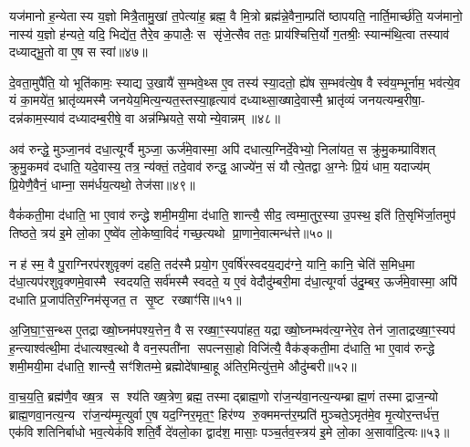 यज॑मानो ह॒न्येतास्य य॒ज्ञो मित्रै॒तामु॒खां त॒पेत्या॑ह॒ ब्रह्म॒ वै मि॒त्रो ब्रह्म॑न्ने॒वैना॒म्प्रति॑ ष्ठापयति॒ नार्ति॒मार्च्छ॑ति॒ यज॑मानो॒ नास्य॑ य॒ज्ञो ह॑न्यते॒ यदि॒ भिद्ये॑त॒ तैरे॒व क॒पालैः॒ स सृ॑जे॒त्सैव ततः॒ प्राय॑श्चित्ति॒र्यो ग॒तश्रीः॒ स्यान्म॑थि॒त्वा तस्याव॑ दध्याद्भू॒तो वा ए॒ष स स्वां॥४७॥

दे॒वता॒मुपै॑ति॒ यो भूति॑कामः॒ स्याद्य उ॒खायै॑ स॒म्भवे॒थ्स ए॒व तस्य॑ स्या॒दतो॒ ह्ये॑ष स॒म्भव॑त्ये॒ष वै स्व॑य॒म्भूर्नाम॒ भव॑त्ये॒व यं का॒मये॑त॒ भ्रातृ॑व्यमस्मै जनयेय॒मित्य॒न्यत॒स्तस्या॒हृत्याव॑ दध्याथ्सा॒ख्षादे॒वास्मै॒ भ्रातृ॑व्यं जनयत्यम्ब॒रीषा॒- दन्न॑काम॒स्याव॑ दध्यादम्ब॒रीषे॒ वा अन्न॑म्भ्रियते॒ सयोन्ये॒वान्नम्॥४८॥

अव॑ रुन्द्धे॒ मुञ्जा॒नव॑ दधा॒त्यूर्ग्वै मुञ्जा॒ ऊर्ज॑मे॒वास्मा॒ अपि॑ दधात्य॒ग्निर्दे॒वेभ्यो॒ निला॑यत॒ स क्रु॑मु॒कम्प्रावि॑शत् क्रुमु॒कमव॑ दधाति॒ यदे॒वास्य॒ तत्र॒ न्य॑क्तं॒ तदे॒वाव॑ रुन्द्ध॒ आज्ये॑न॒ सं यौत्ये॒तद्वा अ॒ग्नेः प्रि॒यं धाम॒ यदाज्य॑म् प्रि॒येणै॒वैनं॒ धाम्ना॒ सम॑र्धय॒त्यथो॒ तेज॑सा॥४९॥

वैकं॑कती॒मा द॑धाति॒ भा ए॒वाव॑ रुन्द्धे शमी॒मयी॒मा द॑धाति॒ शान्त्यै॒ सीद॒ त्वम्मा॒तुर॒स्या उ॒पस्थ॒ इति॑ ति॒सृभि॑र्जा॒तमुप॑ तिष्ठते॒ त्रय॑ इ॒मे लो॒का ए॒ष्वे॑व लो॒केष्वा॒विदं॑ गच्छ॒त्यथो प्रा॒णाने॒वात्मन्ध॑त्ते॥५०॥

{\anuvakamend[{प्र॒जाप॑तिर्\mbox{}ऋच्छे॒त्स्वामे॒वान्नं॒ तेज॑सा॒ चतु॑स्त्रिशच्च॥९॥}]}

न ह॑ स्म॒ वै पु॒राग्निरप॑रशुवृक्णं दहति॒ तद॑स्मै प्रयो॒ग ए॒वर्\mbox{}षि॑रस्वदय॒द्यद॑ग्ने॒ यानि॒ कानि॒ चेति॑ स॒मिध॒मा द॑धा॒त्यप॑रशुवृक्णमे॒वास्मै स्वदयति॒ सर्व॑मस्मै स्वदते॒ य ए॒वं वेदौदु॑म्बरी॒मा द॑धा॒त्यूर्ग्वा उ॑दु॒म्बर॒ ऊर्ज॑मे॒वास्मा॒ अपि॑ दधाति प्र॒जाप॑तिर॒ग्निम॑सृजत॒ त सृ॒ष्ट रख्षाꣳ॑सि॥५१॥

अ॒जि॒घा॒ꣳ॒स॒न्थ्स ए॒तद्राख्षो॒घ्नम॑पश्य॒त्तेन॒ वै स रख्षा॒ꣳ॒स्यपा॑हत॒ यद्राख्षो॒घ्नम्भव॑त्य॒ग्नेरे॒व तेन॑ जा॒ताद्रख्षा॒ꣳ॒स्यप॑ ह॒न्त्याश्व॑त्थी॒मा द॑धात्यश्व॒त्थो वै वन॒स्पती॑ना सपत्नसा॒हो विजि॑त्यै॒ वैक॑ङ्कती॒मा द॑धाति॒ भा ए॒वाव॑ रुन्द्धे शमी॒मयी॒मा द॑धाति॒ शान्त्यै॒ सꣳ॑शितम्मे॒ ब्रह्मोदे॑षाम्बा॒हू अ॑तिर॒मित्यु॑त्त॒मे औदु॑म्बरी॥५२॥

वा॒च॒य॒ति॒ ब्रह्म॑णै॒व ख्ष॒त्र स श्य॑ति ख्ष॒त्रेण॒ ब्रह्म॒ तस्माद्ब्राह्म॒णो रा॑ज॒न्य॑वा॒नत्य॒न्यम्ब्राह्म॒णं तस्माद्राज॒न्यो ब्राह्म॒णवा॒नत्य॒न्य रा॑ज॒न्य॑म्मृ॒त्युर्वा ए॒ष यद॒ग्निर॒मृत॒ꣳ॒ हिर॑ण्य रु॒क्ममन्त॑र॒म्प्रति॑ मुञ्चते॒ऽमृत॑मे॒व मृ॒त्योर॒न्तर्ध॑त्त॒ एक॑विशतिनिर्बाधो भव॒त्येक॑विशति॒र्वै दे॑वलो॒का द्वाद॑श॒ मासाः॒ पञ्च॒र्तव॒स्त्रय॑ इ॒मे लो॒का अ॒सावा॑दि॒त्यः॥५३॥


